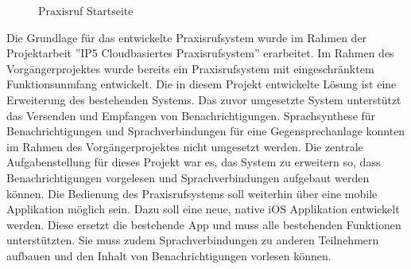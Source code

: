 \begin{figure}[h]
    \centering
    \begin{minipage}[b]{1\textwidth}
        \caption{Praxisruf Startseite}
    \end{minipage}
    \label{fig:AdminUI-Introduction}
\end{figure}

Die Grundlage für das entwickelte Praxisrufsystem wurde im Rahmen der Projektarbeit ''IP5 Cloudbasiertes Praxisrufsystem'' erarbeitet.
Im Rahmen des Vorgängerprojektes wurde bereits ein Praxisrufsystem mit eingeschränktem Funktionsunmfang entwickelt.
Die in diesem Projekt entwickelte Lösung ist eine Erweiterung des bestehenden Systems.
Das zuvor umgesetzte System unterstützt das Versenden und Empfangen von Benachrichtigungen.
Sprachsynthese für Benachrichtigungen und Sprachverbindungen für eine Gegensprechanlage konnten im Rahmen des Vorgängerprojektes nicht umgesetzt werden.
Die zentrale Aufgabenstellung für dieses Projekt war es, das System zu erweitern so, dass Benachrichtigungen vorgelesen und Sprachverbindungen aufgebaut werden können.
Die Bedienung des Praxisrufsystems soll weiterhin über eine mobile Applikation möglich sein.
Dazu soll eine neue, native iOS Applikation entwickelt werden.
Diese ersetzt die bestehende App und muss alle bestehenden Funktionen unterstützten.
Sie muss zudem Sprachverbindungen zu anderen Teilnehmern aufbauen und den Inhalt von Benachrichtigungen vorlesen können.

